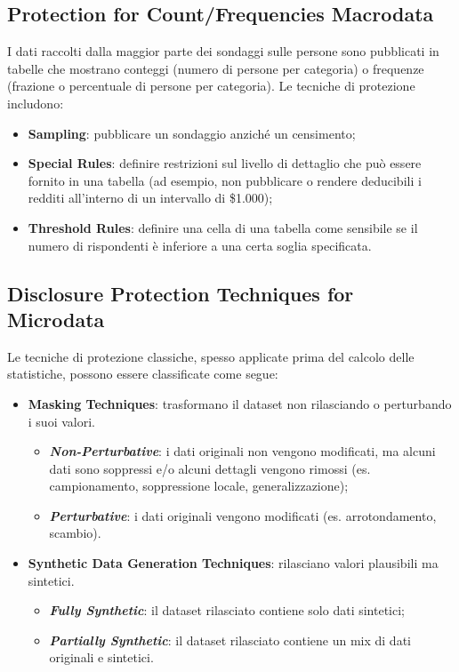 \documentclass{report}
\begin{document}
\subsection{Protection for Count/Frequencies Macrodata}
I dati raccolti dalla maggior parte dei sondaggi sulle persone sono pubblicati in tabelle che mostrano conteggi (numero di persone per categoria) o frequenze (frazione o percentuale di persone per categoria). Le tecniche di protezione includono:
\begin{itemize}
    \item \textbf{Sampling}: pubblicare un sondaggio anziché un censimento;
    \item \textbf{Special Rules}: definire restrizioni sul livello di dettaglio che può essere fornito in una tabella (ad esempio, non pubblicare o rendere deducibili i redditi all'interno di un intervallo di \$1.000);
    \item \textbf{Threshold Rules}: definire una cella di una tabella come sensibile se il numero di rispondenti è inferiore a una certa soglia specificata.
\end{itemize}

\subsection{Disclosure Protection Techniques for Microdata}
Le tecniche di protezione classiche, spesso applicate prima del calcolo delle statistiche, possono essere classificate come segue:
\begin{itemize}
    \item \textbf{Masking Techniques}: trasformano il dataset non rilasciando o perturbando i suoi valori.
    \begin{itemize}
        \item \textbf{\textit{Non-Perturbative}}: i dati originali non vengono modificati, ma alcuni dati sono soppressi e/o alcuni dettagli vengono rimossi (es. campionamento, soppressione locale, generalizzazione);
        \item \textbf{\textit{Perturbative}}: i dati originali vengono modificati (es. arrotondamento, scambio).
    \end{itemize}
    \item \textbf{Synthetic Data Generation Techniques}: rilasciano valori plausibili ma sintetici.
    \begin{itemize}
        \item \textbf{\textit{Fully Synthetic}}: il dataset rilasciato contiene solo dati sintetici;
        \item \textbf{\textit{Partially Synthetic}}: il dataset rilasciato contiene un mix di dati originali e sintetici.
    \end{itemize}
\end{itemize}
\end{document}
